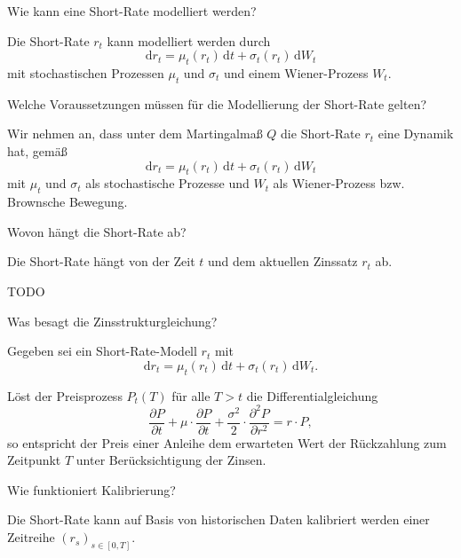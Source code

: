 \begin{QandA}
    \item Wie kann eine Short-Rate modelliert werden?
    \begin{answered}
        Die Short-Rate $r_t$ kann modelliert werden durch
        \[
            \mathrm{d} r_t = \mu_t(r_t) \, \mathrm{d} t + \sigma_t(r_t) \, \mathrm{d} W_t
        \]
        mit stochastischen Prozessen $\mu_t$ und $\sigma_t$ und einem Wiener-Prozess $W_t$.
    \end{answered}

    \item Welche Voraussetzungen müssen für die Modellierung der Short-Rate gelten?
    \begin{answered}
        Wir nehmen an, dass unter dem Martingalmaß $Q$ die Short-Rate $r_t$ eine Dynamik hat, gemäß
        \[
            \mathrm{d} r_t = \mu_t (r_t) \, \mathrm{d} t + \sigma_t (r_t) \, \mathrm{d} W_t
        \]
        mit $\mu_t$ und $\sigma_t$ als stochastische Prozesse und $W_t$ als Wiener-Prozess bzw. Brownsche Bewegung.
    \end{answered}

    \item Wovon hängt die Short-Rate ab?
    \begin{answered}
        Die Short-Rate hängt von der Zeit $t$ und dem aktuellen Zinssatz $r_t$ ab.

        TODO
    \end{answered}

    \item Was besagt die Zinsstrukturgleichung?
    \begin{answered}
        Gegeben sei ein Short-Rate-Modell $r_t$ mit
        \[
            \mathrm{d} r_t = \mu_t(r_t) \, \mathrm{d} t + \sigma_t(r_t) \, \mathrm{d} W_t.
        \]

        Löst der Preisprozess $P_t(T)$ für alle $T > t$ die Differentialgleichung
        \begin{equation}
            \tag{Zinsstrukturgleichung}
            \frac{\partial P}{\partial t} + \mu \cdot \frac{\partial P}{\partial t} + \frac{\sigma^2}{2} \cdot \frac{\partial^2 P}{\partial r^2} = r \cdot P,
        \end{equation}
        so entspricht der Preis einer Anleihe dem erwarteten Wert der Rückzahlung zum Zeitpunkt $T$ unter Berücksichtigung der Zinsen.
    \end{answered}

    \item Wie funktioniert Kalibrierung?
    \begin{answered}
        Die Short-Rate kann auf Basis von historischen Daten kalibriert werden einer Zeitreihe $(r_s)_{s \in [0, T]}$.


\end{answered}
\end{QandA}
